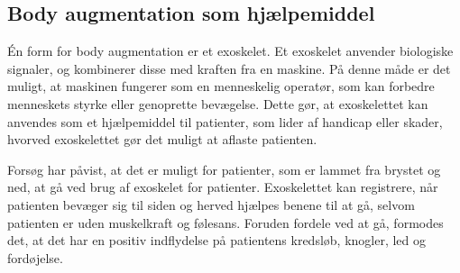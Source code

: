 \subsection{Body augmentation som hjælpemiddel}
Én form for body augmentation er et exoskelet. Et exoskelet  anvender biologiske signaler, og kombinerer disse med kraften fra en maskine. På denne måde er det muligt, at maskinen fungerer som en menneskelig operatør, som kan forbedre menneskets styrke eller genoprette bevægelse. \citep{yang2008} Dette gør, at exoskelettet kan anvendes som et hjælpemiddel til patienter, som lider af handicap eller skader, hvorved exoskelettet gør det muligt at aflaste patienten. \citep{bogue2015} 

Forsøg har påvist, at det er muligt for patienter, som er lammet fra brystet og ned, at gå ved brug af exoskelet for patienter. Exoskelettet kan registrere, når patienten bevæger sig til siden og herved hjælpes benene til at gå, selvom patienten er uden muskelkraft og følesans. Foruden fordele ved at gå, formodes det, at det har en positiv indflydelse på patientens kredsløb, knogler, led og fordøjelse. \citep{regmidt2015}